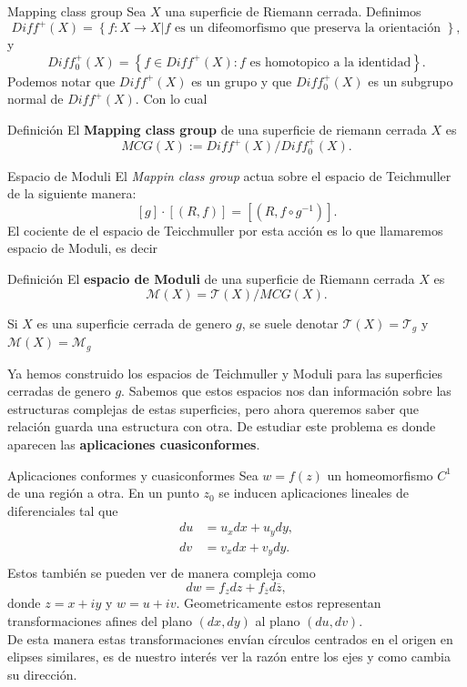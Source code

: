 \documentclass[xcolor=dvipsnames,10pt]{beamer}
\begin{document}
    \begin{frame}{Mapping class group}
        Sea $X$ una superficie de Riemann cerrada. Definimos
        $$Diff^+(X)=\left\{f:X\to X| f \text{ es un difeomorfismo que preserva la orientación }\right\},$$
        y
        $$Diff^+_0(X)=\left\{f\in Diff^+(X):f\text{ es homotopico a la identidad}\right\}.$$
        Podemos notar que $Diff^+(X)$ es un grupo y que $Diff^+_0(X)$ es un subgrupo normal de $Diff^+(X).$ Con lo cual 
        \begin{block}{Definición}
            El \textbf{Mapping class group} de una superficie de riemann cerrada $X$ es
            $$MCG(X):=Diff^+(X)/Diff^+_0(X).$$
        \end{block}
        
    \end{frame}
    \begin{frame}{Espacio de Moduli}
        El \textit{Mappin class group} actua sobre el espacio de Teichmuller de la siguiente manera:
        $$[g]\cdot[(R,f)]=[(R,f\circ g^{-1})].$$
        El cociente de el espacio de Teicchmuller por esta acción es lo que llamaremos espacio de Moduli, es decir
        \begin{block}{Definición}
            El \textbf{espacio de Moduli} de una superficie de Riemann cerrada $X$ es
            $$\mathcal{M}(X)=\mathcal{T}(X)/MCG(X).$$
        \end{block}
        Si $X$ es una superficie cerrada de genero $g$, se suele denotar $\mathcal{T}(X)=\mathcal{T}_g$ y $\mathcal{M}(X)=\mathcal{M}_g$
    \end{frame}
    \begin{frame}
        Ya hemos construido los espacios de Teichmuller y Moduli para las superficies cerradas de genero $g$. Sabemos que estos espacios nos dan información sobre las estructuras complejas de estas superficies, pero ahora queremos saber que relación guarda una estructura con otra. De estudiar este problema es donde aparecen las \textbf{aplicaciones cuasiconformes}.
    \end{frame}

    

\begin{frame}{Aplicaciones conformes y cuasiconformes}
Sea $w=f(z)$ un homeomorfismo $C^1$ de una región a otra. En un punto $z_0$ se inducen aplicaciones lineales de diferenciales tal que
\begin{align*}
    du&=u_xdx+u_ydy,\\
    dv&=v_xdx+v_ydy.\\
\end{align*}
Estos también se pueden ver de manera compleja como
$$dw=f_zdz+f_{\overline{z}}d\overline{z},$$
donde $z=x+iy$ y $w=u+iv.$ Geometricamente  estos representan transformaciones afines del plano $(dx,dy)$ al plano
$(du,dv).$\\

De esta manera estas transformaciones envían círculos centrados en el origen en elipses similares, es de nuestro interés ver la razón entre los ejes y como cambia su dirección.    

\end{frame}
\end{document}
